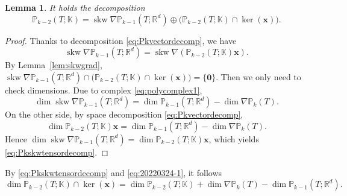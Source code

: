 \documentclass[10pt]{amsart}
\newtheorem{lemma}[theorem]{Lemma}
\newcommand{\skw}{\operatorname{skw}}
\numberwithin{equation}{section}
\begin{document}
\begin{lemma}
It holds the decomposition
\begin{equation}\label{eq:Pkskwtensordecomp}  
\mathbb P_{k-2}(T;\mathbb K)=\skw\nabla\mathbb P_{k-1}(T;\mathbb R^d)\oplus\big(\mathbb P_{k-2}(T;\mathbb K)\cap\ker(\boldsymbol{x})\big).
\end{equation}
\end{lemma}
\begin{proof}
Thanks to decomposition \eqref{eq:Pkvectordecomp}, we have 
$$
\skw\nabla\mathbb P_{k-1}(T;\mathbb R^d)=\skw\nabla(\mathbb P_{k-2}(T;\mathbb K)\boldsymbol{x}).
$$
By Lemma~\ref{lem:skwgrad}, $\skw\nabla\mathbb P_{k-1}(T;\mathbb R^d)\cap\big(\mathbb P_{k-2}(T;\mathbb K)\cap\ker(\boldsymbol{x})\big)=\{\boldsymbol{0}\}$. Then we only need to check dimensions.
Due to complex \eqref{eq:polycomplex1},
\begin{equation}\label{eq:20220324-1}  
\dim\skw\nabla\mathbb P_{k-1}(T;\mathbb R^d)=\dim\mathbb P_{k-1}(T;\mathbb R^d)-\dim\nabla\mathbb P_k(T).
\end{equation}
On the other side, by space decomposition \eqref{eq:Pkvectordecomp},
$$
\dim\mathbb P_{k-2}(T;\mathbb K)\boldsymbol{x}=\dim\mathbb P_{k-1}(T;\mathbb R^{d})-\dim\nabla\mathbb P_k(T).
$$
Hence $\dim\skw\nabla\mathbb P_{k-1}(T;\mathbb R^d)=\dim\mathbb P_{k-2}(T;\mathbb K)\boldsymbol{x}$, which yields \eqref{eq:Pkskwtensordecomp}.
\end{proof}


 By \eqref{eq:Pkskwtensordecomp} and \eqref{eq:20220324-1}, it follows
\begin{equation}\label{eq:20220324-2}
\dim\mathbb P_{k-2}(T;\mathbb K)\cap\ker(\boldsymbol{x})=\dim\mathbb P_{k-2}(T;\mathbb K)+\dim\nabla\mathbb P_k(T)- \dim\mathbb P_{k-1}(T;\mathbb R^d).
\end{equation}
\end{document}
